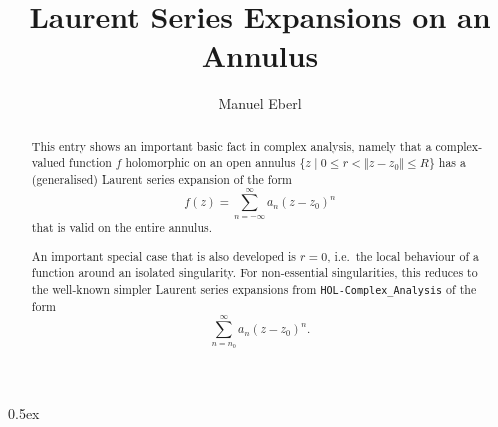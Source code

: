\documentclass[11pt,a4paper]{article}
\begin{document}
\title{Laurent Series Expansions on an Annulus}
\author{Manuel Eberl}
\maketitle

\begin{abstract}
This entry shows an important basic fact in complex analysis, namely that a complex-valued function $f$ holomorphic on an open annulus 
$\{z \mid 0\leq r < \Vert z - z_0\Vert \leq R\}$ has a (generalised) Laurent series expansion of the form
  \[f(z) = \sum_{n=-\infty}^\infty a_n (z - z_0)^n\]
that is valid on the entire annulus.

An important special case that is also developed is $r = 0$, i.e.\ the local behaviour of a function around an isolated singularity.
For non-essential singularities, this reduces to the well-known simpler Laurent series expansions from \texttt{HOL-Complex\_Analysis} of
  the form $$\sum_{n=n_0}^\infty a_n (z-z_0)^n. $$
\end{abstract}

\tableofcontents

\newpage
\parindent 0pt\parskip 0.5ex



%
%
\end{document}
